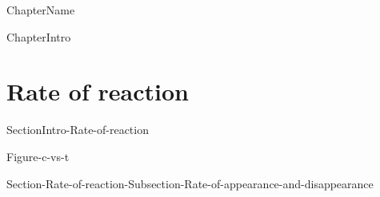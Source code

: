 \documentclass[main.tex]{subfiles}
\newcommand\chapterlabel{Ch-kinetics}\setcounter{figurenewcounter}{0}\setcounter{tablenewcounter}{0}\setcounter{formulanewcounter}{0}\chapterpicture{../{\chapterlabel}/figure1}\chapterpicturelabel{PxFuel}
\begin{document}
  
 
 \setcounter{chapter}{7}  {ChapterName}



%
  {ChapterIntro}







\section{Rate of reaction}{SectionIntro-Rate-of-reaction}
\sloppy\begin{description}
  {Figure-c-vs-t}
\item[\docfilehook{Rate of appearance and disappearance}{}] {Section-Rate-of-reaction-Subsection-Rate-of-appearance-and-disappearance}
\end{description}
\end{document}
